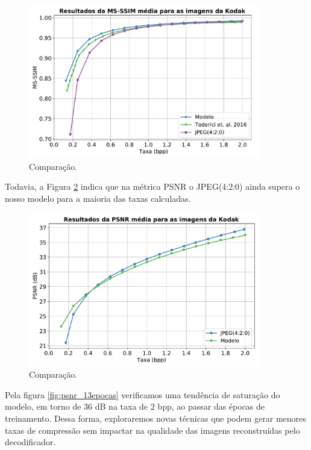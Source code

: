 \begin{figure}
	\centering
	\includegraphics[width=0.9\textwidth]{figuras/msssim_ae_jpeg_toderici.pdf}
	\caption{Comparação.}
	\label{fig:msssim_ae_jpeg_toderici}
\end{figure}	


Todavia, a Figura \ref{fig:psnr_ae_jpeg} indica que na métrica PSNR o JPEG(4:2:0) ainda supera o nosso modelo para a maioria das taxas calculadas. 

\begin{figure}
	\centering
	\includegraphics[width=0.9\textwidth]{figuras/psnr_ae_jpeg.pdf}
	\caption{Comparação.}
	\label{fig:psnr_ae_jpeg}
\end{figure}	


Pela figura \ref{fig:psnr_13epocas} verificamos uma tendência de saturação do modelo, em torno de 36 dB na taxa de 2 bpp, ao passar das épocas de treinamento. Dessa forma, exploraremos novas técnicas que podem gerar menores taxas de compressão sem impactar na qualidade das imagens reconstruídas pelo decodificador.


